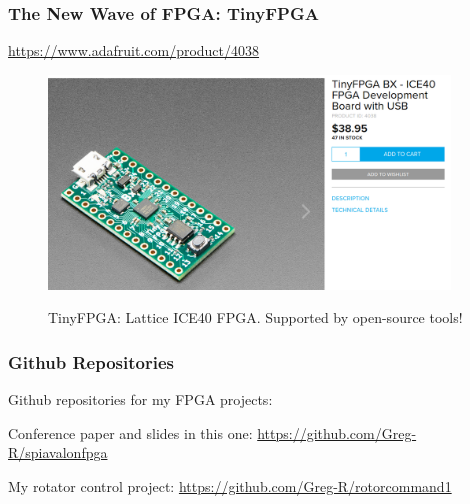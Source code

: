 \documentclass{beamer}
\begin{document}
\begin{frame}
\frametitle{The New Wave of FPGA: TinyFPGA}

\url{https://www.adafruit.com/product/4038}

\begin{figure}[h]
	\centering
	\includegraphics[width=0.95\textwidth]{graphics/tinyfpga.png}
	\centering\bfseries
	\caption{TinyFPGA: Lattice ICE40 FPGA. Supported by open-source tools!}
\end{figure}


\end{frame}

\begin{frame}
\frametitle{Github Repositories}

Github repositories for my FPGA projects:

Conference paper and slides in this one:
\url{https://github.com/Greg-R/spiavalonfpga}

My rotator control project:
\url{https://github.com/Greg-R/rotorcommand1}

\end{frame}
\end{document}
